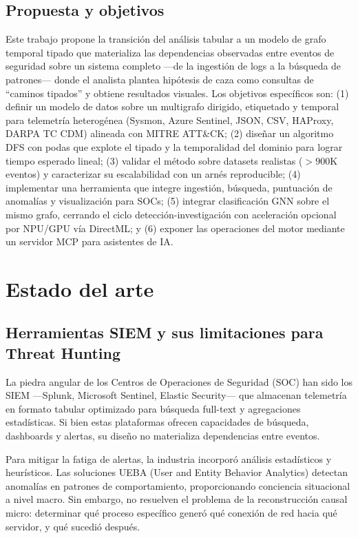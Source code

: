 \documentclass[11pt,a4paper]{article}
\begin{document}
\subsection{Propuesta y objetivos}
Este trabajo propone la transición del análisis tabular a un modelo de grafo
temporal tipado que materializa las dependencias observadas entre eventos de
seguridad sobre un sistema completo ---de la ingestión de logs a la búsqueda de
patrones--- donde el analista plantea hipótesis de caza como consultas de
``caminos tipados'' y obtiene resultados visuales. Los objetivos específicos
son: (1) definir un modelo de datos sobre un multigrafo dirigido, etiquetado y
temporal para telemetría heterogénea (Sysmon, Azure Sentinel, JSON, CSV,
HAProxy, DARPA TC CDM) alineada con MITRE ATT\&CK; (2) diseñar un algoritmo DFS
con podas que explote el tipado y la temporalidad del dominio para lograr
tiempo esperado lineal; (3) validar el método sobre datasets realistas
($> 900$K eventos) y caracterizar su escalabilidad con un arnés reproducible;
(4) implementar una herramienta que integre ingestión, búsqueda, puntuación de
anomalías y visualización para SOCs; (5) integrar clasificación GNN sobre el
mismo grafo, cerrando el ciclo detección-investigación con aceleración opcional
por NPU/GPU vía DirectML; y (6) exponer las operaciones del motor mediante un
servidor MCP para asistentes de IA.

\section{Estado del arte}

\subsection{Herramientas SIEM y sus limitaciones para Threat Hunting}
La piedra angular de los Centros de Operaciones de Seguridad (SOC) han sido los
SIEM ---Splunk, Microsoft Sentinel, Elastic Security--- que almacenan
telemetría en formato tabular optimizado para búsqueda full-text y agregaciones
estadísticas. Si bien estas plataformas ofrecen capacidades de búsqueda,
dashboards y alertas, su diseño no materializa dependencias entre
eventos.

Para mitigar la fatiga de alertas, la industria incorporó análisis estadísticos
y heurísticos. Las soluciones UEBA (User and Entity Behavior Analytics)
detectan anomalías en patrones de comportamiento, proporcionando conciencia
situacional a nivel macro. Sin embargo, no resuelven el problema de la
reconstrucción causal micro: determinar qué proceso específico generó qué
conexión de red hacia qué servidor, y qué sucedió después.
\end{document}
